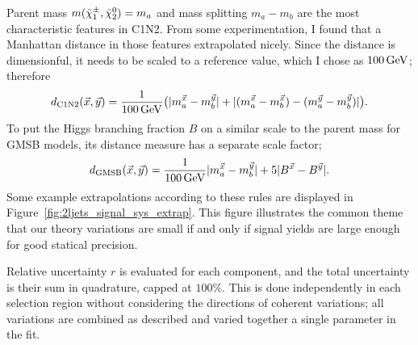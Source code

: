 Parent mass $m(\chargino_1, \neutralino_2) = m_a$
and mass splitting $m_a - m_b$ are the most
characteristic features in C1N2.
From some experimentation, I found that a Manhattan distance in those features
extrapolated nicely.
Since the distance is dimensionful, it needs to be scaled to a reference value,
which I chose as $100\,\eV[G]$; therefore
\begin{equation}
d_\mathrm{C1N2}(\vec x, \vec y) =
\frac{1}{100\,\eV[G]}
\big(
|m_a^{\vec x} - m_b^{\vec y}|
+
|(m_a^{\vec x} - m_b^{\vec x}) - (m_a^{\vec y} - m_b^{\vec y})|
\big)
.
\end{equation}
To put the Higgs branching fraction $B$ on a similar scale to the parent mass
for GMSB models, its distance measure has a separate scale factor;
\begin{equation}
d_\mathrm{GMSB}(\vec x, \vec y) =
\frac{1}{100\,\eV[G]}
|m_a^{\vec x} - m_b^{\vec y}|
+
5
|B^{\vec x} - B^{\vec y}|
.
\end{equation}
Some example extrapolations according to these rules are displayed in
Figure~\ref{fig:2ljets_signal_sys_extrap}.
This figure illustrates the common theme that our theory variations are small
if and only if signal yields are large enough for good statical precision.

Relative uncertainty $r$ is evaluated for each component, and the total
uncertainty is their sum in quadrature, capped at $100\%$.
This is done independently in each selection region without considering the
directions of coherent variations; all variations are combined as described
and varied together a single parameter in the fit.


